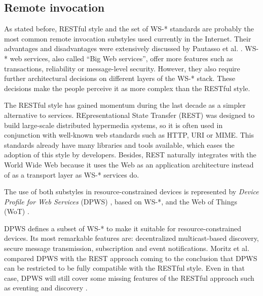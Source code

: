 \subsection{Remote invocation}
\label{sec:remote_invocation}


As stated before, RESTful style and the set of WS-* standards are probably the most common remote invocation substyles used currently in the Internet.
Their advantages and disadvantages were extensively discussed by Pautasso et al. \cite{pautasso_restful_2008}.
WS-* web services, also called ``Big Web services'', offer more features such as transactions, reliability or message-level security.
However, they also require further architectural decisions on different layers of the WS-* stack.
These decisions make the people perceive it as more complex than the RESTful style. %


The RESTful style has gained momentum during the last decade as a simpler alternative to services.
REpresentational State Transfer (REST) was designed to build large-scale distributed hypermedia systems,
so it is often used in conjunction with well-known web standards such as HTTP, URI or MIME.
This standards already have many libraries and tools available, which eases the adoption of this style by developers.
Besides, REST naturally integrates with the World Wide Web because it uses the Web as an application architecture instead of as a transport layer as WS-* services do.


\medskip


The use of both substyles in resource-constrained devices is represented by
\textit{Device Profile for Web Services} (DPWS) \cite{moritz_devices_2010}, based on WS-*,
and the Web of Things (WoT) \cite{guinard_internet_2011}. %


DPWS defines a subset of WS-* to make it suitable for resource-constrained devices.
Its most remarkable features are: decentralized multicast-based discovery, secure message transmission, subscription and event notifications.
Moritz et al. compared DPWS with the REST approach coming to the conclusion that DPWS can be restricted to be fully compatible with the RESTful style.
Even in that case, DPWS will still cover some missing features of the RESTful approach such as eventing and discovery \cite{moritz_devices_2010}.


